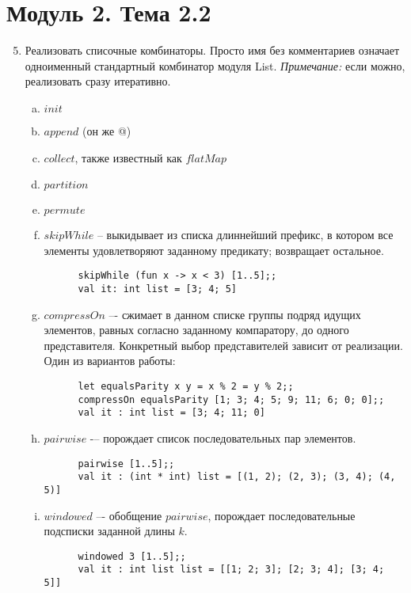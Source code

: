 \documentclass[a4paper,11pt]{article}
\begin{document}
\section*{Модуль 2. Тема 2.2}

\begin{enumerate}[{2-}1]
  \setcounter{enumi}{4}
\item Реализовать списочные комбинаторы. Просто имя без комментариев означает 
  одноименный стандартный комбинатор модуля List.
  \emph{Примечание:} если можно, реализовать сразу итеративно.
  \begin{enumerate}[(a)]
  \item $init$
  \item $append$ (он же @)
  \item $collect$, также известный как $flatMap$
  \item $partition$
  \item $permute$
  \item $skipWhile$ -- выкидывает из списка длиннейший префикс, в котором все 
    элементы удовлетворяют заданному предикату; возвращает остальное.
    \begin{lstlisting}
      skipWhile (fun x -> x < 3) [1..5];;
      val it: int list = [3; 4; 5]
    \end{lstlisting}
  \item $compressOn$ –- сжимает в данном списке группы подряд идущих элементов,
    равных согласно заданному компаратору, до одного представителя. Конкретный 
    выбор представителей зависит от реализации. Один из вариантов работы:
    \begin{lstlisting}
      let equalsParity x y = x % 2 = y % 2;;
      compressOn equalsParity [1; 3; 4; 5; 9; 11; 6; 0; 0];;
      val it : int list = [3; 4; 11; 0]
    \end{lstlisting}
  \item $pairwise$ -– порождает список последовательных пар элементов.
    \begin{lstlisting}
      pairwise [1..5];;
      val it : (int * int) list = [(1, 2); (2, 3); (3, 4); (4, 5)]
    \end{lstlisting}
  \item $windowed$ –- обобщение $pairwise$, порождает последовательные подсписки 
    заданной длины $k$.
    \begin{lstlisting}
      windowed 3 [1..5];;
      val it : int list list = [[1; 2; 3]; [2; 3; 4]; [3; 4; 5]]
    \end{lstlisting}
  \end{enumerate}


\end{enumerate}
\end{document}
